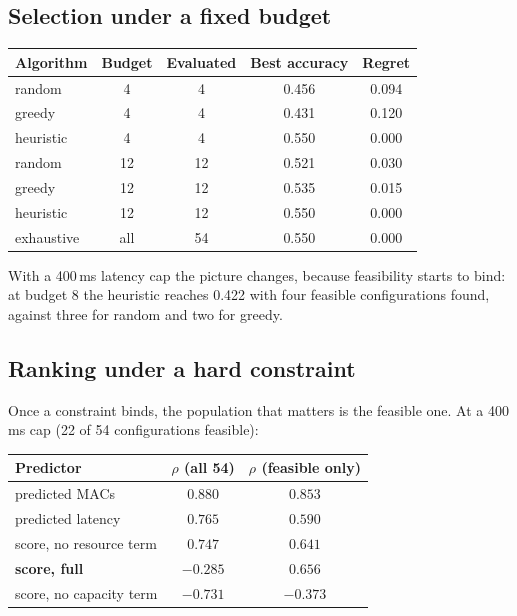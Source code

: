 \documentclass[11pt,a4paper]{article}
\begin{document}
\subsection{Selection under a fixed budget}

\begin{center}
\begin{tabular}{@{}lcccc@{}}
\toprule
Algorithm & Budget & Evaluated & Best accuracy & Regret \\
\midrule
random     & 4  & 4  & 0.456 & 0.094 \\
greedy     & 4  & 4  & 0.431 & 0.120 \\
heuristic  & 4  & 4  & 0.550 & 0.000 \\
random     & 12 & 12 & 0.521 & 0.030 \\
greedy     & 12 & 12 & 0.535 & 0.015 \\
heuristic  & 12 & 12 & 0.550 & 0.000 \\
exhaustive & all & 54 & 0.550 & 0.000 \\
\bottomrule
\end{tabular}
\end{center}

With a 400\,ms latency cap the picture changes, because feasibility starts to
bind: at budget 8 the heuristic reaches 0.422 with four feasible configurations
found, against three for random and two for greedy.

\subsection{Ranking under a hard constraint}

Once a constraint binds, the population that matters is the feasible one. At a
400\,ms cap (22 of 54 configurations feasible):

\begin{center}
\begin{tabular}{@{}lcc@{}}
\toprule
Predictor & $\rho$ (all 54) & $\rho$ (feasible only) \\
\midrule
predicted MACs          & $0.880$ & $0.853$ \\
predicted latency       & $0.765$ & $0.590$ \\
score, no resource term & $0.747$ & $0.641$ \\
\textbf{score, full}    & $-0.285$ & $\mathbf{0.656}$ \\
score, no capacity term & $-0.731$ & $-0.373$ \\
\bottomrule
\end{tabular}
\end{center}
\end{document}
